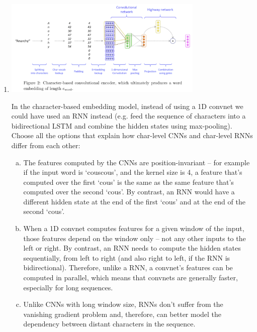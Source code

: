 \begin{enumerate}[1.]

\item {}

\begin{center}
\includegraphics[width=0.75\textwidth]{4-1.png}
\end{center}

In the character-based embedding model, instead of using a 1D convnet we could have used an RNN instead (e.g. feed the sequence of characters into a bidirectional LSTM and combine the hidden states using max-pooling). Choose all the options that explain how char-level CNNs and char-level RNNs differ from each other:

\begin{enumerate}[(a)]
\item The features computed by the CNNs are position-invariant -- for example if the input word is `couscous', and the kernel size is 4, a feature that's computed over the first `cous' is the same as the same feature that's computed over the second `cous'. By contrast, an RNN would have a different hidden state at the end of the first `cous' and at the end of the second `cous'.
\item When a 1D convnet computes features for a given window of the input, those features depend on the window only -- not any other inputs to the left or right. By contrast, an RNN needs to compute the hidden states sequentially, from left to right (and also right to left, if the RNN is bidirectional). Therefore, unlike a RNN, a convnet's features can be computed in parallel, which means that convnets are generally faster, especially for long sequences.
\item Unlike CNNs with long window size, RNNs don't suffer from the vanishing gradient problem and, therefore, can better model the dependency between distant characters in the sequence.
\end{enumerate}


\end{enumerate}
